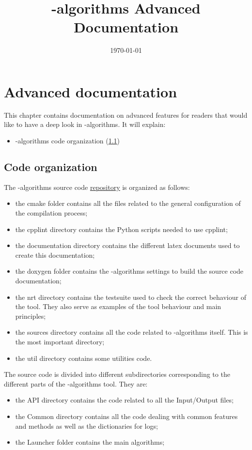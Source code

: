 \documentclass[a4paper, 12pt]{report}
\begin{document}
\title{\Dynawo-algorithms Advanced Documentation}
\date\today

\maketitle
\tableofcontents

\chapter{Advanced documentation}

This chapter contains documentation on advanced features for readers that would like to have a deep look in \Dynawo-algorithms. It will explain:
\begin{itemize}
\item \Dynawo-algorithms code organization (\ref{Dynawo_Algorithms_Advanced_Documentation_Code_Organization})
\end{itemize}

\section{Code organization}
\label{Dynawo_Algorithms_Advanced_Documentation_Code_Organization}

The \Dynawo-algorithms source code \href{https://github.com/dynawo/dynawo-algorithms.git}
{\underline{repository}} is organized as follows:
\begin{itemize}
\item the cmake folder contains all the files related to the general
configuration of the compilation process;
\item the cpplint directory contains the Python scripts needed to use cpplint;
\item the documentation directory contains the different latex documents used to
create this documentation;
\item the doxygen folder contains the \Dynawo-algorithms settings to build the source code
documentation;
\item the nrt directory contains the testsuite used to check the correct
behaviour of the tool. They also serve as examples of the 
tool behaviour and main principles;
\item the sources directory contains all the code related to \Dynawo-algorithms itself. This is the most important directory;
\item the util directory contains some utilities code.
\end{itemize}

The source code is divided into different subdirectories corresponding to the different parts of the \Dynawo-algorithms tool. They are:
\begin{itemize}
\item the API directory contains the code related to all the Input/Output
files;
\item the Common directory contains all the code dealing with common features and methods as well as the dictionaries for logs;
\item the Launcher folder contains the main algorithms;
\end{itemize}
\end{document}
